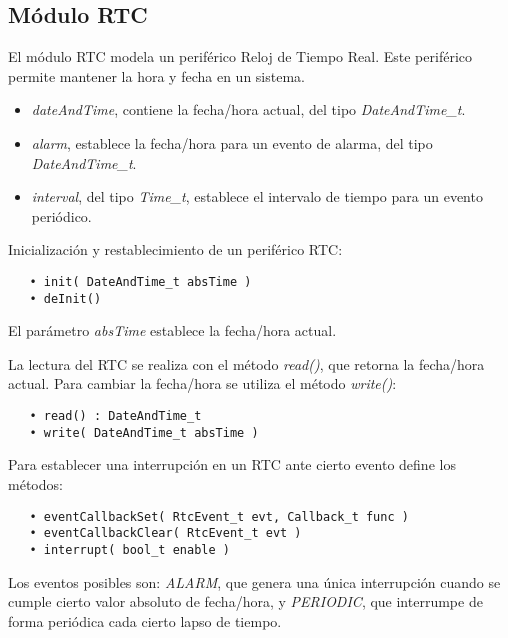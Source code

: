 \subsection{Módulo RTC}

El módulo RTC modela un periférico Reloj de Tiempo Real. Este periférico permite mantener la hora y fecha en un sistema.


\begin{itemize}
\item
\emph{dateAndTime}, contiene la fecha/hora actual, del tipo \emph{DateAndTime\_t}.
\item
\emph{alarm}, establece la fecha/hora para un evento de alarma, del tipo \emph{DateAndTime\_t}.
\item
\emph{interval}, del tipo \emph{Time\_t}, establece el intervalo de tiempo para un evento periódico.
\end{itemize}


Inicialización y restablecimiento de un periférico RTC:

\begin{verbatim}
   • init( DateAndTime_t absTime )
   • deInit()
\end{verbatim}

El parámetro \emph{absTime} establece la fecha/hora actual. 

La lectura del RTC se realiza con el método \emph{read()}, que retorna la fecha/hora actual. Para cambiar la fecha/hora se utiliza el método \emph{write()}:

\begin{verbatim}
   • read() : DateAndTime_t
   • write( DateAndTime_t absTime )
\end{verbatim}

Para establecer una interrupción en un RTC ante cierto evento define los métodos: 

\begin{verbatim}
   • eventCallbackSet( RtcEvent_t evt, Callback_t func )
   • eventCallbackClear( RtcEvent_t evt )
   • interrupt( bool_t enable )
\end{verbatim}

Los eventos posibles son: \emph{ALARM}, que genera una única interrupción cuando se cumple cierto valor absoluto de fecha/hora, y \emph{PERIODIC}, que interrumpe de forma periódica cada cierto lapso de tiempo.
